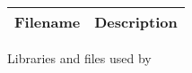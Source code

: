 \begin{figure}[H]
	\begin{center}
		\begin{tabular}{|c|c|}
			\hline
			Filename & Description\\
			\hline
			\hline
			
			\hline
		\end{tabular}
		\label{tabular:libraries}
		\caption{Libraries and files used by \Kieker{}}
	\end{center}
\end{figure}